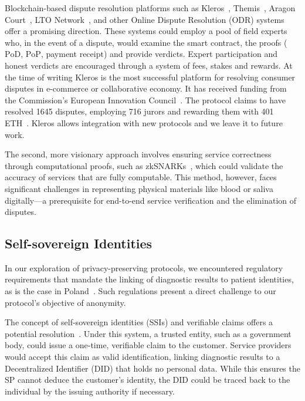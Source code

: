 \documentclass[pdftex,twocolumn,epjc3]{svjour3}
\begin{document}
Blockchain-based dispute resolution platforms such as  Kleros~\cite{bergollaKlerosSociolegalCase2022, nappertDecentralizedJusticeReinventing2020, gudkovCrowdArbitrationBlockchain2020}, Themis~\cite{mengThemisDecentralizedEscrow2019}, Aragon Court~\cite{AragonWhitepaper2023,aragonDecentralizedDisputeResolution}, LTO Network~\cite{ltonetworkNextGenBlockchainB2B}, and other Online Dispute Resolution (ODR) systems~\cite{allenGovernanceBlockchainDispute2019, lingwallShouldCodeBe2019} offer a promising direction. These systems could employ a pool of field experts who, in the event of a dispute, would examine the smart contract, the proofs ( $\mathrm{PoD}$, $\mathrm{PoP}$, payment $\mathrm{receipt}$) and provide verdicts. Expert participation and honest verdicts are encouraged through a system of fees, stakes and rewards. At the time of writing Kleros is the most successful platform for resolving consumer disputes in e-commerce or collaborative economy. It has received funding from the Commission's European Innovation Council~\cite{CommissionEuropeanInnovation2020}. The protocol claims to have resolved 1645 disputes, employing 716 jurors and rewarding them with 401 ETH~\cite{KlerosHomepage}. Kleros allows integration with new protocols and we leave it to future work.

The second, more visionary approach involves ensuring service correctness through computational proofs, such as zkSNARKs~\cite{ben-sassonSNARKsVerifyingProgram2013}, which could validate the accuracy of services that are fully computable. This method, however, faces significant challenges in representing physical materials like blood or saliva digitally—a prerequisite for end-to-end service verification and the elimination of disputes.

\subsection{Self-sovereign Identities}
In our exploration of privacy-preserving protocols, we encountered regulatory requirements that mandate the linking of diagnostic results to patient identities, as is the case in Poland~\cite{ministerstwozdrowiaRegulationMinisterHealth2006}. Such regulations present a direct challenge to our protocol's objective of anonymity.

The concept of self-sovereign identities (SSIs) and verifiable claims offers a potential resolution~\cite{muhleSurveyEssentialComponents2018}. Under this system, a trusted entity, such as a government body, could issue a one-time, verifiable claim to the customer. Service providers would accept this claim as valid identification, linking diagnostic results to a Decentralized Identifier (DID) that holds no personal data. While this ensures the SP cannot deduce the customer's identity, the DID could be traced back to the individual by the issuing authority if necessary.
\end{document}
